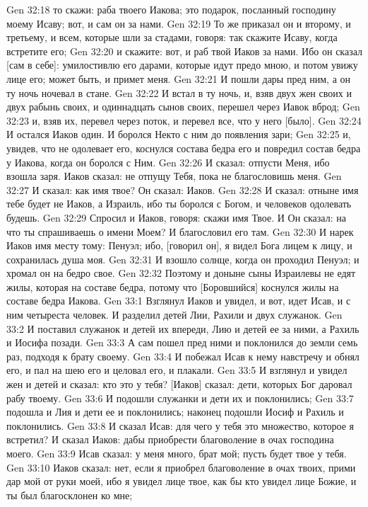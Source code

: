 Gen 32:18  то скажи: раба твоего Иакова; это подарок, посланный господину моему Исаву; вот, и сам он за нами.
Gen 32:19  То же приказал он и второму, и третьему, и всем, которые шли за стадами, говоря: так скажите Исаву, когда встретите его;
Gen 32:20  и скажите: вот, и раб твой Иаков за нами. Ибо он сказал [сам в себе]: умилостивлю его дарами, которые идут предо мною, и потом увижу лице его; может быть, и примет меня.
Gen 32:21  И пошли дары пред ним, а он ту ночь ночевал в стане.
Gen 32:22  И встал в ту ночь, и, взяв двух жен своих и двух рабынь своих, и одиннадцать сынов своих, перешел через Иавок вброд;
Gen 32:23  и, взяв их, перевел через поток, и перевел все, что у него [было].
Gen 32:24  И остался Иаков один. И боролся Некто с ним до появления зари;
Gen 32:25  и, увидев, что не одолевает его, коснулся состава бедра его и повредил состав бедра у Иакова, когда он боролся с Ним.
Gen 32:26  И сказал: отпусти Меня, ибо взошла заря. Иаков сказал: не отпущу Тебя, пока не благословишь меня.
Gen 32:27  И сказал: как имя твое? Он сказал: Иаков.
Gen 32:28  И сказал: отныне имя тебе будет не Иаков, а Израиль, ибо ты боролся с Богом, и человеков одолевать будешь.
Gen 32:29  Спросил и Иаков, говоря: скажи имя Твое. И Он сказал: на что ты спрашиваешь о имени Моем? И благословил его там.
Gen 32:30  И нарек Иаков имя месту тому: Пенуэл; ибо, [говорил он], я видел Бога лицем к лицу, и сохранилась душа моя.
Gen 32:31  И взошло солнце, когда он проходил Пенуэл; и хромал он на бедро свое.
Gen 32:32  Поэтому и доныне сыны Израилевы не едят жилы, которая на составе бедра, потому что [Боровшийся] коснулся жилы на составе бедра Иакова.
Gen 33:1  Взглянул Иаков и увидел, и вот, идет Исав, и с ним четыреста человек. И разделил детей Лии, Рахили и двух служанок.
Gen 33:2  И поставил служанок и детей их впереди, Лию и детей ее за ними, а Рахиль и Иосифа позади.
Gen 33:3  А сам пошел пред ними и поклонился до земли семь раз, подходя к брату своему.
Gen 33:4  И побежал Исав к нему навстречу и обнял его, и пал на шею его и целовал его, и плакали.
Gen 33:5  И взглянул и увидел жен и детей и сказал: кто это у тебя? [Иаков] сказал: дети, которых Бог даровал рабу твоему.
Gen 33:6  И подошли служанки и дети их и поклонились;
Gen 33:7  подошла и Лия и дети ее и поклонились; наконец подошли Иосиф и Рахиль и поклонились.
Gen 33:8  И сказал Исав: для чего у тебя это множество, которое я встретил? И сказал Иаков: дабы приобрести благоволение в очах господина моего.
Gen 33:9  Исав сказал: у меня много, брат мой; пусть будет твое у тебя.
Gen 33:10  Иаков сказал: нет, если я приобрел благоволение в очах твоих, прими дар мой от руки моей, ибо я увидел лице твое, как бы кто увидел лице Божие, и ты был благосклонен ко мне;
